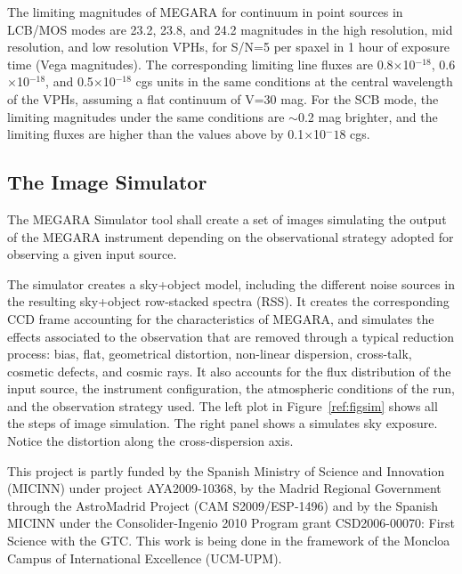 
The limiting magnitudes of MEGARA for continuum in point sources in LCB/MOS modes are 23.2, 23.8, and 24.2 magnitudes in the high resolution, mid resolution, and low resolution VPHs, for S/N=5 per spaxel in 1 hour of exposure time (Vega magnitudes). The corresponding limiting line fluxes are 0.8$\times$10$^{-18}$, 0.6$\times$10$^{-18}$, and 0.5$\times$10$^{-18}$ cgs units in the same conditions at the central wavelength of the VPHs, assuming a flat continuum of V=30 mag. For the SCB mode, the limiting magnitudes under the same conditions are $\sim$0.2 mag brighter, and the limiting fluxes are higher than the values above by 0.1$\times$10$^-18$ cgs.

\subsection{The Image Simulator}

The MEGARA Simulator tool shall create a set of images simulating the output of the MEGARA instrument depending on the observational strategy adopted for observing a given input source. 

The simulator creates a sky+object model, including the different noise sources in the resulting sky+object row-stacked spectra (RSS). It creates the corresponding CCD frame accounting for the characteristics of MEGARA, and simulates the effects associated to the observation that are removed through a typical reduction process: bias, flat, geometrical distortion, non-linear  dispersion, cross-talk, cosmetic defects, and cosmic rays. It also accounts for the flux distribution of the input source, the instrument configuration, the atmospheric conditions of the run, and the observation strategy used. The left plot in Figure~\ref{ref:figsim} shows all the steps of image simulation. The right panel shows a simulates sky exposure. Notice the
distortion along the cross-dispersion axis.


\acknowledgements This project is partly funded by the Spanish Ministry of Science and Innovation (MICINN) under project AYA2009-10368, by the Madrid Regional Government through the AstroMadrid Project (CAM S2009/ESP-1496) and by the Spanish MICINN under the Consolider-Ingenio 2010 Program grant CSD2006-00070: First Science with the GTC. This work is being done in the framework of the Moncloa Campus of International Excellence (UCM-UPM).
